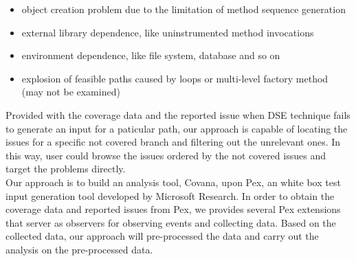 \begin{itemize}
	\item object creation problem due to the limitation of method sequence generation 
	\item external library dependence, like uninstrumented method invocations
	\item environment dependence, like file system, database and so on
	\item explosion of feasible paths caused by loops or multi-level factory method (may not be examined)
\end{itemize}
Provided with the coverage data and the reported issue when DSE technique fails to generate an input for a paticular path, our approach is capable of locating the issues for a specific not covered branch and filtering out the unrelevant ones. In this way, user could browse the issues ordered by the not covered issues and target the problems directly. 
\\Our approach is to build an analysis tool, Covana, upon Pex, an white box test input generation tool developed by Microsoft Research. In order to obtain the coverage data and reported issues from Pex, we provides several Pex extensions that server as observers for observing events and collecting data. Based on the collected data, our approach will pre-processed the data and carry out the analysis on the pre-processed data. 


 

